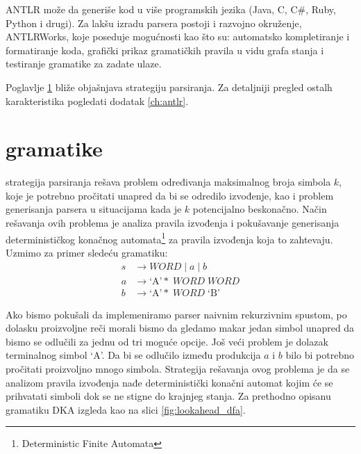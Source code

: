   
ANTLR može da generiše kod u više programskih jezika (Java, C, C\#, Ruby, Python i drugi). 
Za lakšu izradu parsera postoji i razvojno okruženje, ANTLRWorks, koje poseduje mogućnosti kao što su: 
automatsko kompletiranje i formatiranje koda, grafički prikaz gramatičkih pravila u vidu grafa stanja i testiranje gramatike za zadate ulaze.

Poglavlje \ref{sec:lla-gram} bliže objašnjava \LLa strategiju parsiranja.
Za detaljniji pregled ostalh karakteristika pogledati dodatak \ref{ch:antlr}.

\section{\LLa gramatike}
\label{sec:lla-gram}

\LLa strategija parsiranja rešava problem određivanja maksimalnog broja simbola $k$, koje je potrebno pročitati unapred da bi se odredilo izvođenje, kao i problem generisanja parsera u situacijama kada je $k$ potencijalno beskonačno.
Način rešavanja ovih problema je analiza pravila izvođenja i pokušavanje generisanja determinističkog konačnog automata\footnote{\eng Deterministic Finite Automata} za pravila izvođenja koja to zahtevaju.
Uzmimo za primer sledeću gramatiku:
\begin{align*}
    s &\rightarrow WORD \; | \; a \; | \; b \\
    a &\rightarrow \text{`A'}\ast \; WORD \; WORD \\
    b &\rightarrow \text{`A'}\ast \; WORD \; \text{`B'}
\end{align*}

Ako bismo pokušali da implemeniramo parser naivnim rekurzivnim spustom, po dolasku proizvoljne reči morali bismo da gledamo makar jedan simbol unapred da bismo se odlučili za jednu od tri moguće opcije.
Još veći problem je dolazak terminalnog simbol `A'. Da bi se odlučilo između produkcija $a$ i $b$ bilo bi potrebno pročitati proizvoljno mnogo simbola.
Strategija rešavanja ovog problema je da se analizom pravila izvođenja nađe deterministički konačni automat kojim će se prihvatati simboli dok se ne stigne do krajnjeg stanja.
Za prethodno opisanu gramatiku DKA izgleda kao na slici \ref{fig:lookahead_dfa}.

